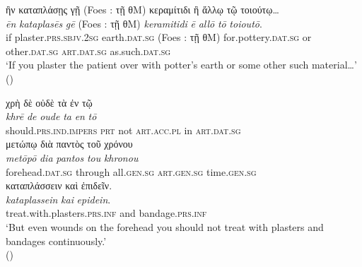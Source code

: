 \documentclass[output=paper,colorlinks,citecolor=brown]{langscibook}
\begin{document}
\begin{exe}
\ex\label{ex:HCkataplasma2}
\glll ἢν καταπλάσῃς γῇ {(Foes : τῇ θM)} κεραμίτιδι ἢ ἄλλῳ τῷ τοιούτῳ… \\ 
\textit{ēn} \textit{kataplasēs} \textit{gē} {(Foes : τῇ θM)} \textit{keramitidi} \textit{ē} \textit{allō} \textit{tō} \textit{toioutō}. \\
if plaster.\textsc{prs.sbjv.2sg} earth.\textsc{dat.sg} {(Foes : τῇ θM)} for.pottery.\textsc{dat.sg} or other.\textsc{dat.sg} \textsc{art.dat.sg} as.such.\textsc{dat.sg} \\
\glt ‘If you plaster the patient over with potter’s earth or some other such material…’ \\
\hspace*{\fill}()
\end{exe}

\begin{exe}
\ex\label{ex:HCkataplasma3}
\glll χρὴ δὲ οὐδὲ τὰ ἐν τῷ  \\
\textit{khrē} \textit{de} \textit{oude} \textit{ta} \textit{en} \textit{tō}  \\
should.\textsc{prs.ind.impers} \textsc{prt} not \textsc{art.acc.pl} in \textsc{art.dat.sg}   \\

\glll μετώπῳ διὰ παντὸς τοῦ χρόνου \\
\textit{metōpō} \textit{dia} \textit{pantos} \textit{tou} \textit{khronou} \\
forehead.\textsc{dat.sg} through all.\textsc{gen.sg} \textsc{art.gen.sg} time.\textsc{gen.sg} \\

\glll καταπλάσσειν καὶ ἐπιδεῖν. \\
\textit{kataplassein} \textit{kai} \textit{epidein}. \\
treat.with.plasters.\textsc{prs.inf} and bandage.\textsc{prs.inf} \\
\glt ‘But even wounds on the forehead you should not treat with plasters and bandages continuously.’ \\
\hspace*{\fill}()
\end{exe}
\end{document}
